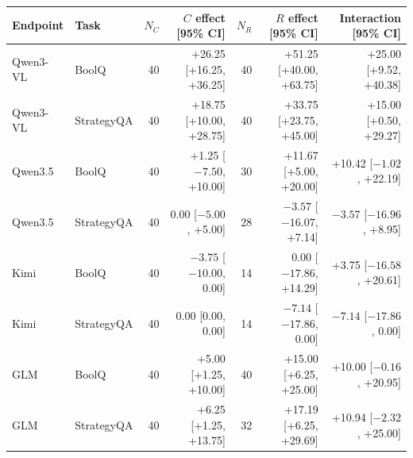 \begin{tabular}{llrrrrr}
\toprule
Endpoint & Task & $N_C$ & $C$ effect [95\% CI] & $N_R$ & $R$ effect [95\% CI] & Interaction [95\% CI]\\
\midrule
Qwen3-VL & BoolQ & 40 & +26.25 [+16.25, +36.25] & 40 & +51.25 [+40.00, +63.75] & +25.00 [+9.52, +40.38]\\
Qwen3-VL & StrategyQA & 40 & +18.75 [+10.00, +28.75] & 40 & +33.75 [+23.75, +45.00] & +15.00 [+0.50, +29.27]\\
Qwen3.5 & BoolQ & 40 & +1.25 [$-7.50$, +10.00] & 30 & +11.67 [+5.00, +20.00] & +10.42 [$-1.02$, +22.19]\\
Qwen3.5 & StrategyQA & 40 & 0.00 [$-5.00$, +5.00] & 28 & $-3.57$ [$-16.07$, +7.14] & $-3.57$ [$-16.96$, +8.95]\\
Kimi & BoolQ & 40 & $-3.75$ [$-10.00$, 0.00] & 14 & 0.00 [$-17.86$, +14.29] & +3.75 [$-16.58$, +20.61]\\
Kimi & StrategyQA & 40 & 0.00 [0.00, 0.00] & 14 & $-7.14$ [$-17.86$, 0.00] & $-7.14$ [$-17.86$, 0.00]\\
GLM & BoolQ & 40 & +5.00 [+1.25, +10.00] & 40 & +15.00 [+6.25, +25.00] & +10.00 [$-0.16$, +20.95]\\
GLM & StrategyQA & 40 & +6.25 [+1.25, +13.75] & 32 & +17.19 [+6.25, +29.69] & +10.94 [$-2.32$, +25.00]\\
\bottomrule
\end{tabular}
